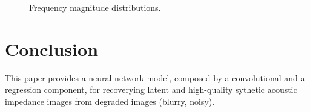 \documentclass[conference]{IEEEtran}
\begin{document}
\begin{figure}[!t]
{		\label{fig_frequencies_5}}
	\caption{Frequency magnitude distributions.}
	\label{fig_frequencies}
\end{figure}

\section{Conclusion}
This paper provides a neural network model, composed by a convolutional and a regression component, for recoverying latent and high-quality
sythetic acoustic impedance images from degraded images (blurry, noisy).
\end{document}
